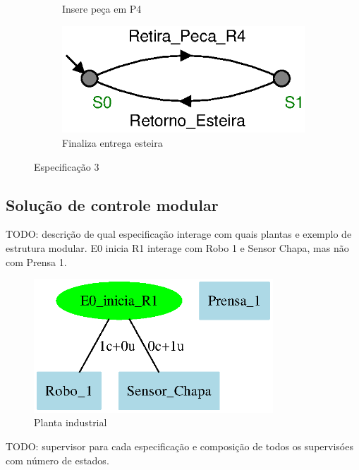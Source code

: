 \begin{figure}[H]
\begin{subfigure}{0.45\textwidth}
      \caption{Insere peça em P4}
      \label{fig:e89c}
  \end{subfigure}
  \hfill
  \begin{subfigure}{0.45\textwidth}
      \centering
      \includegraphics[width=\textwidth]{imagens/E9_finaliza_entrega_P4.eps}
      \caption{Finaliza entrega esteira}
      \label{fig:e89d}
  \end{subfigure}
  \caption{Especificação 3}
  \label{fig:e89}
\end{figure}

\subsection{Solução de controle modular}
TODO: descrição de qual especificação interage com quais plantas e exemplo de estrutura modular.
E0 inicia R1 interage com Robo 1 e Sensor Chapa, mas não com Prensa 1.
\begin{figure}[H]%
  \centering
  \includegraphics[width=0.8\textwidth]{imagens/modular_E0_inicia.eps}
  \caption{Planta industrial}\label{fig:modular}
\end{figure}

TODO: supervisor para cada especificação e composição de todos os supervisóes com número de estados. 